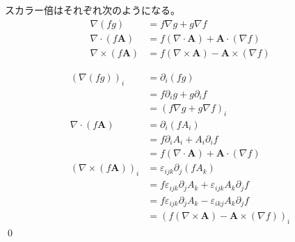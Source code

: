 \documentclass[uplatex,dvipdfmx,a4paper,11pt]{jlreq}
\makeatletter
\newcommand{\grad}{\nabla}
\renewcommand{\div}{\nabla\cdot}
\newcommand{\rot}{\nabla\times}
\theoremstyle{definition}
\renewenvironment{proof}[1][\proofname]{\par
  \normalfont
  \topsep6\p@\@plus6\p@ \trivlist
  \item[\hskip\labelsep{\bfseries #1}\@addpunct{\bfseries}]\ignorespaces\quad\par
}{%
  \qed\endtrivlist\@endpefalse
}
\renewcommand\proofname{証明}
\makeatother
\begin{document}
\begin{theorem}[スカラー倍の勾配・発散・回転]
  スカラー倍はそれぞれ次のようになる。
  \begin{align}
    \grad{(fg)}     & = f\grad{g} + g\grad{f}                    \\
    \div{(f\bm{A})} & = f(\div{\bm{A}}) + \bm{A}\cdot(\grad{f})  \\
    \rot{(f\bm{A})} & = f(\rot{\bm{A}}) - \bm{A}\times(\grad{f})
  \end{align}
\end{theorem}
\begin{proof}
  \begin{align}
    (\grad{(fg)})_i     & = \partial_i(fg)                                                    \\
                        & = f\partial_i g + g\partial_i f                                     \\
                        & = (f\grad{g} + g\grad{f})_i                                         \\
    \div{(f\bm{A})}     & = \partial_i(fA_i)                                                  \\
                        & = f\partial_iA_i + A_i\partial_if                                   \\
                        & = f(\div{\bm{A}}) + \bm{A}\cdot(\grad{f})                           \\
    (\rot{(f\bm{A})})_i & = \varepsilon_{ijk}\partial_j(fA_k)                                 \\
                        & = f\varepsilon_{ijk}\partial_jA_k + \varepsilon_{ijk}A_k\partial_jf \\
                        & = f\varepsilon_{ijk}\partial_jA_k - \varepsilon_{ikj}A_k\partial_jf \\
                        & = (f(\rot{\bm{A}}) - \bm{A}\times(\grad{f}))_i
  \end{align}
\end{proof}
\end{document}
